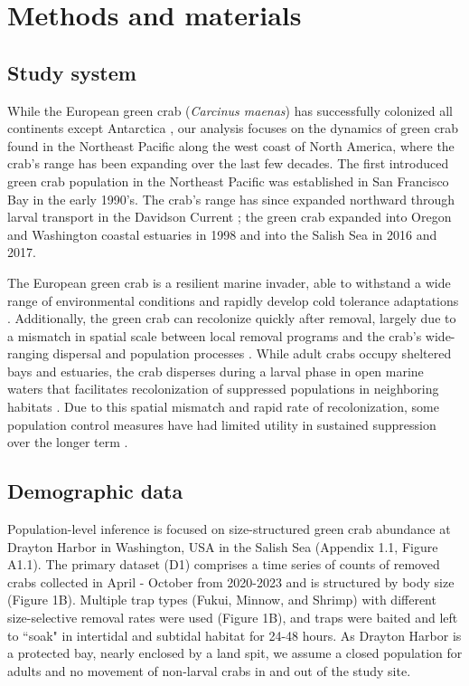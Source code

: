 \documentclass{article}
\begin{document}
\section{Methods and materials}

\subsection{Study system}

While the European green crab (\textit{Carcinus maenas}) has successfully colonized all continents except Antarctica \parencite{yamada2001global}, our analysis focuses on the dynamics of green crab found in the Northeast Pacific along the west coast of North America, where the crab's range has been expanding over the last few decades. The first introduced green crab population in the Northeast Pacific was established in San Francisco Bay in the early 1990's. The crab's range has since expanded northward through larval transport in the Davidson Current \parencite{yamada2021ocean}; the green crab expanded into Oregon and Washington coastal estuaries in 1998 and into the Salish Sea in 2016 and 2017. 

The European green crab is a resilient marine invader, able to withstand a wide range of environmental conditions and rapidly develop cold tolerance adaptations \parencite{tepolt2020rapid}. Additionally, the green crab can recolonize quickly after removal, largely due to a mismatch in spatial scale between local removal programs and the crab’s wide-ranging dispersal and population processes \parencite{keller2025transition}. While adult crabs occupy sheltered bays and estuaries, the crab disperses during a larval phase in open marine waters that facilitates recolonization of suppressed populations in neighboring habitats \parencite{yamada2021ocean}. Due to this spatial mismatch and rapid rate of recolonization, some population control measures have had limited utility in sustained suppression over the longer term \parencite{tummon2024rebound, duncombe2015evaluating}. 

\subsection{Demographic data}

Population-level inference is focused on size-structured green crab abundance at Drayton Harbor in Washington, USA in the Salish Sea (Appendix 1.1, Figure A1.1). The primary dataset (D1) comprises a time series of counts of removed crabs collected in April - October from 2020-2023 and is structured by body size (Figure 1B). Multiple trap types (Fukui, Minnow, and Shrimp) with different size-selective removal rates were used (Figure 1B), and traps were baited and left to ``soak" in intertidal and subtidal habitat for 24-48 hours. As Drayton Harbor is a protected bay, nearly enclosed by a land spit, we assume a closed population for adults and no movement of non-larval crabs in and out of the study site. 
\end{document}
